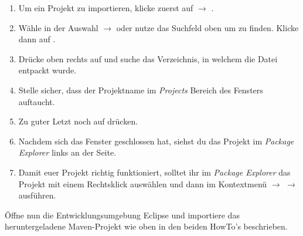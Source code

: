 \begin{Infobox}
    \begin{enumerate}[label=\arabic*.]
        \item Um ein Projekt zu importieren, klicke zuerst auf  $\to$ .
        \item Wähle in der Auswahl  $\to$  oder nutze das Suchfeld oben um  zu finden. Klicke dann auf .
        \item Drücke oben rechts auf  und suche das Verzeichnis, in welchem die Datei \jvkpackage { }entpackt wurde.
        \item Stelle sicher, dass der Projektname im \textit{Projects} Bereich des Fensters auftaucht.
        \item Zu guter Letzt noch auf  drücken.
        \item Nachdem sich das Fenster geschlossen hat, siehst du das Projekt im \textit{Package Explorer} links an der Seite.
        \item Damit euer Projekt richtig funktioniert, solltet ihr im \textit{Package Explorer} das Projekt mit einem Rechtsklick auswählen und dann im Kontextmenü  $\to$  $\to$  ausführen.
    \end{enumerate}
\end{Infobox}


\newpage

Öffne nun die Entwicklungsumgebung Eclipse und importiere das heruntergeladene Maven-Projekt \jvkpackage { } wie oben in den beiden HowTo's beschrieben.

